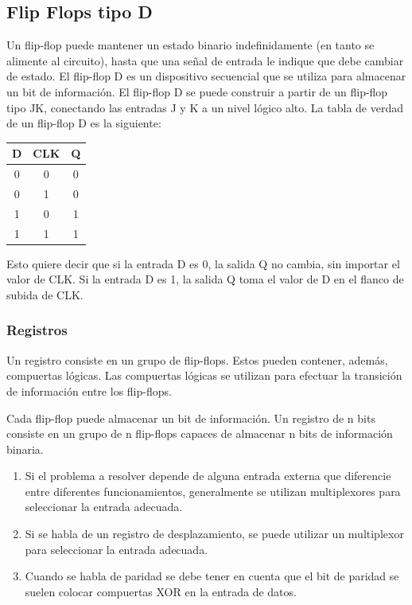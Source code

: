 \subsection{Flip Flops tipo D}
Un flip-flop puede mantener un estado binario indefinidamente (en tanto se alimente al circuito), hasta que una señal de entrada le indique que debe cambiar de estado.
El flip-flop D es un dispositivo secuencial que se utiliza para almacenar un bit de información. El flip-flop D se puede construir a partir de un flip-flop tipo JK, conectando las entradas J y K a un nivel lógico alto. La tabla de verdad de un flip-flop D es la siguiente:

\begin{table}[h]
    \centering
    \begin{tabular}{|c|c|c|}
        \hline
        \textbf{D} & \textbf{CLK} & \textbf{Q} \\ \hline
        0         & 0           & 0         \\ \hline
        0         & 1           & 0         \\ \hline
        1         & 0           & 1         \\ \hline
        1         & 1           & 1         \\ \hline
    \end{tabular}
\end{table}

Esto quiere decir que si la entrada D es 0, la salida Q no cambia, sin importar el valor de CLK. Si la entrada D es 1, la salida Q toma el valor de D en el flanco de subida de CLK.    

\subsubsection{Registros}
Un registro consiste en un grupo de flip-flops. Estos pueden contener, además, compuertas lógicas. Las compuertas lógicas se utilizan para efectuar la transición de información entre los flip-flops.

Cada flip-flop puede almacenar un bit de información. Un registro de n bits consiste en un grupo de n flip-flops capaces de almacenar n bits de información binaria.

\begin{enumerate}
    \item Si el problema a resolver depende de alguna entrada externa que diferencie entre diferentes funcionamientos, generalmente se utilizan multiplexores para seleccionar la entrada adecuada.
    \item Si se habla de un registro de desplazamiento, se puede utilizar un multiplexor para seleccionar la entrada adecuada.
    \item Cuando se habla de paridad se debe tener en cuenta que el bit de paridad se suelen colocar compuertas XOR en la entrada de datos.
\end{enumerate}

